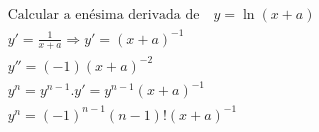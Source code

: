 \begin{ex}
\begin{align}
&\text{Calcular a enésima derivada de}\quad y=\ln{(x+a)}\nonumber\\
&y'=\frac{1}{x+a} \Rightarrow y'=(x+a)^{-1}\nonumber\\
&y''=(-1)(x+a)^{-2}\nonumber\\
&y^{n}=y^{n-1}.y'=y^{n-1}(x+a)^{-1}\nonumber\\
&y^{n}=(-1)^{n-1}(n-1)!(x+a)^{-1}\nonumber
\end{align}
\end{ex}